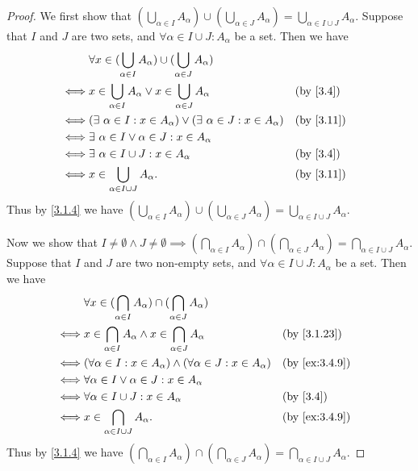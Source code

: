 \begin{proof}
  We first show that \((\bigcup_{\alpha \in I} A_{\alpha}) \cup (\bigcup_{\alpha \in J} A_{\alpha}) = \bigcup_{\alpha \in I \cup J} A_{\alpha}\).
  Suppose that \(I\) and \(J\) are two sets, and \(\forall \alpha \in I \cup J : A_{\alpha}\) be a set.
  Then we have
  \begin{align*}
         & \forall x \in (\bigcup_{\alpha \in I} A_{\alpha}) \cup (\bigcup_{\alpha \in J} A_{\alpha})                              \\
    \iff & x \in \bigcup_{\alpha \in I} A_{\alpha} \lor x \in \bigcup_{\alpha \in J} A_{\alpha}       &  & \text{(by \cref{3.4})}  \\
    \iff & (\exists\ \alpha \in I : x \in A_{\alpha}) \lor (\exists\ \alpha \in J : x \in A_{\alpha}) &  & \text{(by \cref{3.11})} \\
    \iff & \exists\ \alpha \in I \lor \alpha \in J : x \in A_{\alpha}                                                              \\
    \iff & \exists\ \alpha \in I \cup J : x \in A_{\alpha}                                            &  & \text{(by \cref{3.4})}  \\
    \iff & x \in \bigcup_{\alpha \in I \cup J} A_{\alpha}.                                            &  & \text{(by \cref{3.11})}
  \end{align*}
  Thus by \cref{3.1.4} we have \((\bigcup_{\alpha \in I} A_{\alpha}) \cup (\bigcup_{\alpha \in J} A_{\alpha}) = \bigcup_{\alpha \in I \cup J} A_{\alpha}\).

  Now we show that \(I \neq \emptyset \land J \neq \emptyset \implies (\bigcap_{\alpha \in I} A_{\alpha}) \cap (\bigcap_{\alpha \in J} A_{\alpha}) = \bigcap_{\alpha \in I \cup J} A_{\alpha}\).
  Suppose that \(I\) and \(J\) are two non-empty sets, and \(\forall \alpha \in I \cup J : A_{\alpha}\) be a set.
  Then we have
  \begin{align*}
         & \forall x \in (\bigcap_{\alpha \in I} A_{\alpha}) \cap (\bigcap_{\alpha \in J} A_{\alpha})                                  \\
    \iff & x \in \bigcap_{\alpha \in I} A_{\alpha} \land x \in \bigcap_{\alpha \in J} A_{\alpha}      &  & \text{(by \cref{3.1.23})}   \\
    \iff & (\forall \alpha \in I : x \in A_{\alpha}) \land (\forall \alpha \in J : x \in A_{\alpha})  &  & \text{(by \cref{ex:3.4.9})} \\
    \iff & \forall \alpha \in I \lor \alpha \in J : x \in A_{\alpha}                                                                   \\
    \iff & \forall \alpha \in I \cup J : x \in A_{\alpha}                                             &  & \text{(by \cref{3.4})}      \\
    \iff & x \in \bigcap_{\alpha \in I \cup J} A_{\alpha}.                                            &  & \text{(by \cref{ex:3.4.9})}
  \end{align*}
  Thus by \cref{3.1.4} we have \((\bigcap_{\alpha \in I} A_{\alpha}) \cap (\bigcap_{\alpha \in J} A_{\alpha}) = \bigcap_{\alpha \in I \cup J} A_{\alpha}\).
\end{proof}

